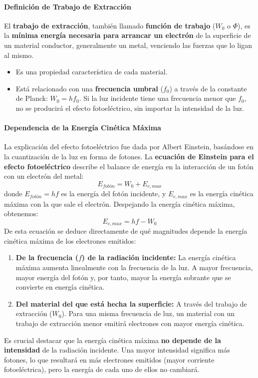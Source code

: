 \paragraph{Definición de Trabajo de Extracción}
El \textbf{trabajo de extracción}, también llamado \textbf{función de trabajo} ($W_0$ o $\Phi$), es la \textbf{mínima energía necesaria para arrancar un electrón} de la superficie de un material conductor, generalmente un metal, venciendo las fuerzas que lo ligan al mismo.
\begin{itemize}
    \item Es una propiedad característica de cada material.
    \item Está relacionado con una \textbf{frecuencia umbral} ($f_0$) a través de la constante de Planck: $W_0 = hf_0$. Si la luz incidente tiene una frecuencia menor que $f_0$, no se producirá el efecto fotoeléctrico, sin importar la intensidad de la luz.
\end{itemize}

\paragraph{Dependencia de la Energía Cinética Máxima}
La explicación del efecto fotoeléctrico fue dada por Albert Einstein, basándose en la cuantización de la luz en forma de fotones. La \textbf{ecuación de Einstein para el efecto fotoeléctrico} describe el balance de energía en la interacción de un fotón con un electrón del metal:
$$ E_{fotón} = W_0 + E_{c,max} $$
donde $E_{fotón} = hf$ es la energía del fotón incidente, y $E_{c,max}$ es la energía cinética máxima con la que sale el electrón.
Despejando la energía cinética máxima, obtenemos:
$$ E_{c,max} = hf - W_0 $$
De esta ecuación se deduce directamente de qué magnitudes depende la energía cinética máxima de los electrones emitidos:
\begin{enumerate}
    \item \textbf{De la frecuencia ($f$) de la radiación incidente:} La energía cinética máxima aumenta linealmente con la frecuencia de la luz. A mayor frecuencia, mayor energía del fotón y, por tanto, mayor la energía sobrante que se convierte en energía cinética.
    \item \textbf{Del material del que está hecha la superficie:} A través del trabajo de extracción ($W_0$). Para una misma frecuencia de luz, un material con un trabajo de extracción menor emitirá electrones con mayor energía cinética.
\end{enumerate}
Es crucial destacar que la energía cinética máxima \textbf{no depende de la intensidad} de la radiación incidente. Una mayor intensidad significa más fotones, lo que resultará en más electrones emitidos (mayor corriente fotoeléctrica), pero la energía de cada uno de ellos no cambiará.

